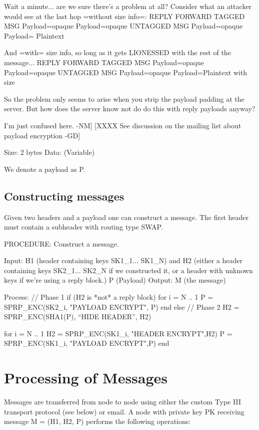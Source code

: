      Wait a minute... are we sure there's a problem at all?  Consider
     what an attacker would see at the last hop =without size info=:
                            REPLY          FORWARD 
          TAGGED MSG     Payload=opaque  Payload=opaque 
          UNTAGGED MSG   Payload=opaque  Payload= Plaintext 

     And =with= size info, so long as it gets LIONESSED with the
     rest of the message...
                            REPLY          FORWARD 
          TAGGED MSG     Payload=opaque  Payload=opaque 
          UNTAGGED MSG   Payload=opaque  Payload=Plaintext with size

     So the problem only seems to arise when you strip the payload
     padding at the server.  But how does the server know not do
     do this with reply payloads anyway?

     I'm just confused here. -NM]
[XXXX See discussion on the mailing list about payload encryption -GD]

Size:   2 bytes
Data:   (Variable)

We denote a payload as P.

\subsection{Constructing messages}

Given two headers and a payload one can construct a
message. The first header must contain a subheader
with routing type SWAP.  

PROCEDURE: Construct a message.

Input: H1 (header containing keys SK1_1... SK1_N)
       and H2 (either a header containing keys SK2_1... SK2_N if
         we constructed it, or a header with unknown keys if we're
         using a reply block.)
       P (Payload)
Output: M (the message)

Process:
	// Phase 1
	if (H2 is *not* a reply block)
		for i = N .. 1
	            P = SPRP_ENC(SK2_i, "PAYLOAD ENCRYPT", P)
		end
        else
	// Phase 2
	H2 = SPRP_ENC(SHA1(P), ``HIDE HEADER'', H2)

	for i = N .. 1
		H2 = SPRP_ENC(SK1_i, "HEADER ENCRYPT",H2)
		P = SPRP_ENC(SK1_i, "PAYLOAD ENCRYPT",P)
	end

\section{Processing of Messages}

Messages are transferred from node to node using either the custom Type
III transport protocol (see below) or email.  A node with private key
PK receiving message M = (H1, H2, P) performs the following operations:

